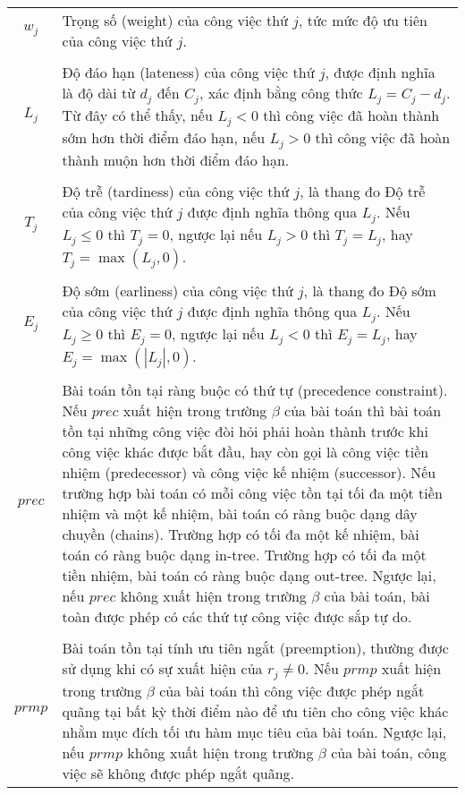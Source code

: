 \documentclass[12pt,a4paper]{report}
\begin{document}
\begin{tabularx}{\linewidth}{ c  X }
		\\
		$w_j$ & Trọng số (weight) của công việc thứ $j$, tức mức độ ưu tiên của công việc thứ $j$. \\
		\\
		$L_j$ & Độ đáo hạn (lateness) của công việc thứ $j$, được định nghĩa là độ dài từ $d_j$ đến $C_j$, xác định bằng công thức $L_j=C_j-d_j$. Từ đây có thể thấy, nếu $L_j < 0$ thì công việc đã hoàn thành sớm hơn thời điểm đáo hạn, nếu $L_j > 0$ thì công việc đã hoàn thành muộn hơn thời điểm đáo hạn. \\
		\\
		$T_j$ & Độ trễ (tardiness) của công việc thứ $j$, là thang đo Độ trễ của công việc thứ $j$ được định nghĩa thông qua $L_j$. Nếu $L_j \leq 0$ thì $T_j=0$, ngược lại nếu $L_j > 0$ thì $T_j = L_j$, hay $T_j=\max (L_j,0)$. \\
		\\
		$E_j$ & Độ sớm (earliness) của công việc thứ $j$, là thang đo Độ sớm của công việc thứ $j$ được định nghĩa thông qua $L_j$. Nếu $L_j \geq 0$ thì $E_j=0$, ngược lại nếu $L_j < 0$ thì $E_j = L_j$, hay $E_j=\max (|L_j|,0)$. \\
		\\
		$prec$ & Bài toán tồn tại ràng buộc có thứ tự (precedence constraint). Nếu $prec$ xuất hiện trong trường $\beta$ của bài toán thì bài toán tồn tại những công việc đòi hỏi phải hoàn thành trước khi công việc khác được bắt đầu, hay còn gọi là công việc tiền nhiệm (predecessor) và công việc kế nhiệm (successor). Nếu trường hợp bài toán có mỗi công việc tồn tại tối đa một tiền nhiệm và một kế nhiệm, bài toán có ràng buộc dạng dây chuyền (chains). Trường hợp có tối đa một kế nhiệm, bài toán có ràng buộc dạng in-tree. Trường hợp có tối đa một tiền nhiệm, bài toán có ràng buộc dạng out-tree. Ngược lại, nếu $prec$ không xuất hiện trong trường $\beta$ của bài toán, bài toàn được phép có các thứ tự công việc được sắp tự do. \\
		\\
		$prmp$ & Bài toán tồn tại tính ưu tiên ngắt (preemption), thường được sử dụng khi có sự xuất hiện của $r_j \neq 0$. Nếu $prmp$ xuất hiện trong trường $\beta$ của bài toán thì công việc được phép ngắt quãng tại bất kỳ thời điểm nào để ưu tiên cho công việc khác nhằm mục đích tối ưu hàm mục tiêu của bài toán. Ngược lại, nếu $prmp$ không xuất hiện trong trường $\beta$ của bài toán, công việc sẽ không được phép ngắt quãng. \\
	\end{tabularx}
\newpage
{} 
\end{document}
